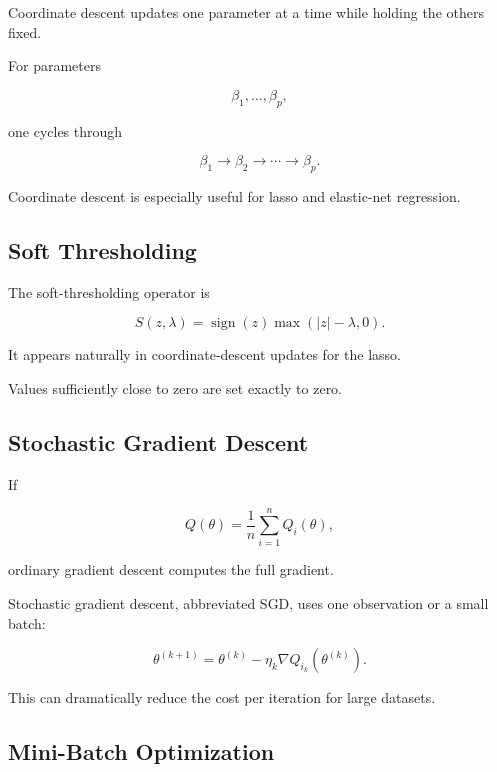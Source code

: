 Coordinate descent updates one parameter at a time while holding the
others fixed.

For parameters

\[
\beta_1,\ldots,\beta_p,
\]

one cycles through

\[
\boxed{
\beta_1
\rightarrow
\beta_2
\rightarrow
\cdots
\rightarrow
\beta_p.
}
\]

Coordinate descent is especially useful for lasso and elastic-net
regression.

\subsection{Soft Thresholding}
\label{subsec:soft-thresholding}

The soft-thresholding operator is

\[
\boxed{
S(z,\lambda)
=
\operatorname{sign}(z)
\max
(
|z|-\lambda,
0
).
}
\]

It appears naturally in coordinate-descent updates for the lasso.

Values sufficiently close to zero are set exactly to zero.

\subsection{Stochastic Gradient Descent}
\label{subsec:stochastic-gradient-descent}

If

\[
Q(\theta)
=
\frac1n
\sum_{i=1}^{n}
Q_i(\theta),
\]

ordinary gradient descent computes the full gradient.

Stochastic gradient descent, abbreviated SGD, uses one observation or a
small batch:

\[
\boxed{
\theta^{(k+1)}
=
\theta^{(k)}
-
\eta_k
\nabla
Q_{i_k}
(
\theta^{(k)}
).
}
\]

This can dramatically reduce the cost per iteration for large datasets.

\subsection{Mini-Batch Optimization}
\label{subsec:minibatch-optimization}

